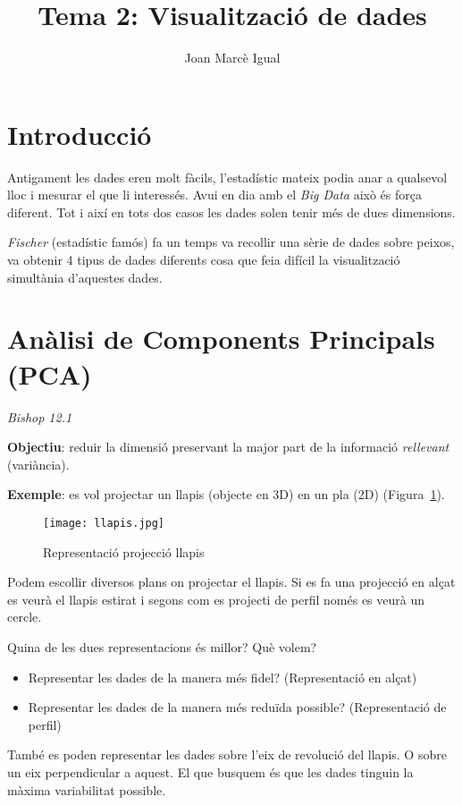 \documentclass[a4paper]{article}
\title{Tema 2: Visualització de dades}
\author{Joan Marcè Igual}
\begin{document}
\maketitle

\section{Introducció}

Antigament les dades eren molt fàcils, l'estadístic mateix podia anar a qualsevol lloc i mesurar el que li interessés. Avui en dia amb el \emph{Big Data} això és força diferent. Tot i així en tots dos casos les dades solen tenir més de dues dimensions. 

\emph{Fischer} (estadístic famós) fa un temps va recollir una sèrie de dades sobre peixos, va obtenir 4 tipus de dades diferents cosa que feia difícil la visualització simultània d'aquestes dades.

\section{Anàlisi de Components Principals (PCA)}
\textit{Bishop 12.1}

\textbf{Objectiu}: reduir la dimensió preservant la major part de la informació \emph{rellevant} (variància). 

\textbf{Exemple}: es vol projectar un llapis (objecte en 3D) en un pla (2D) (Figura~\ref{fig:llapis}).

\begin{figure}[h!]
	\centering
	\texttt{[image: llapis.jpg]}
	\caption{Representació projecció llapis}
	\label{fig:llapis}
\end{figure}

Podem escollir diversos plans on projectar el llapis. Si es fa una projecció en alçat es veurà el llapis estirat i segons com es projecti de perfil només es veurà un cercle.

Quina de les dues representacions és millor? Què volem? 
\begin{itemize}
	\item Representar les dades de la manera més fidel? (Representació en alçat)
	\item Representar les dades de la manera més reduïda possible? (Representació de perfil)
\end{itemize}

També es poden representar les dades sobre l'eix de revolució del llapis. O sobre un eix perpendicular a aquest. El que busquem és que les dades tinguin la màxima variabilitat possible.
\end{document}
